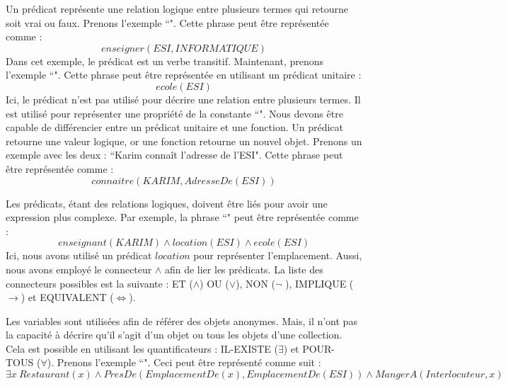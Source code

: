\documentclass{KodeBook}
\begin{document}
Un prédicat représente une relation logique entre plusieurs termes qui retourne soit vrai ou faux.
Prenons l'exemple ``".
Cette phrase peut être représentée comme : 
\[enseigner(ESI, INFORMATIQUE)\]
Dans cet exemple, le prédicat est un verbe transitif. 
Maintenant, prenons l'exemple ``".
Cette phrase peut être représentée en utilisant un prédicat unitaire :
\[ecole(ESI)\]
Ici, le prédicat n'est pas utilisé pour décrire une relation entre plusieurs termes. 
Il est utilisé pour représenter une propriété de la constante ``". 
Nous devons être capable de différencier entre un prédicat unitaire et une fonction. 
Un prédicat retourne une valeur logique, or une fonction retourne un nouvel objet.
Prenons un exemple avec les deux : ``Karim connaît l'adresse de l'ESI". 
Cette phrase peut être représentée comme : 
\[connaitre(KARIM, AdresseDe(ESI))\]

Les prédicats, étant des relations logiques, doivent être liés pour avoir une expression plus complexe. 
Par exemple, la phrase ``" peut être représentée comme :
\[enseignant(KARIM) \wedge location(ESI) \wedge ecole(ESI)\]
Ici, nous avons utilisé un prédicat $location$ pour représenter l'emplacement. 
Aussi, nous avons employé le connecteur $\wedge$ afin de lier les prédicats. 
La liste des connecteurs possibles est la suivante : ET ($ \wedge $) OU ($ \vee $), NON ($ \neg $ ), IMPLIQUE ($\rightarrow$) et EQUIVALENT ($ \Leftrightarrow $).

Les variables sont utilisées afin de référer des objets anonymes.  
Mais, il n'ont pas la capacité à décrire qu'il s'agit d'un objet ou tous les objets d'une collection. 
Cela est possible en utilisant les quantificateurs : IL-EXISTE ($\exists$) et POUR-TOUS ($\forall$).
Prenons l'exemple ``".
Ceci peut être représenté comme suit : 
\[\exists x\ Restaurant(x) \wedge PresDe(EmplacementDe(x), EmplacementDe(ESI)) \wedge  MangerA(Interlocuteur, x)\]
\end{document}
